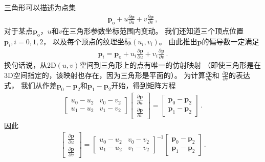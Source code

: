 三角形可以描述为点集
\begin{align*}
    \bm p_{\mathrm{o}}+u\frac{\partial \bm p}{\partial u}+v\frac{\partial \bm p}{\partial v}\, ,
\end{align*}
对于某点$\bm p_{\mathrm{o}}$，$u$和$v$在三角形参数坐标范围内变动。
我们还知道三个顶点位置$\bm p_i, i=0,1,2$，
以及每个顶点的纹理坐标$(u_i,v_i)$。
由此推出$\bm p$的偏导数一定满足
\begin{align*}
    \bm p_i=\bm p_{\mathrm{o}}+u_i\frac{\partial \bm p}{\partial u}+v_i\frac{\partial \bm p}{\partial v}\, .
\end{align*}
换句话说，从2D$(u,v)$空间到三角形上的点有唯一的仿射映射
（即使三角形是在3D空间指定的，该映射也存在，因为三角形是平面的）。
为计算$\displaystyle\frac{\partial \bm p}{\partial u}$和
$\displaystyle\frac{\partial \bm p}{\partial v}$的表达式，
我们从作差$\bm p_0-\bm p_2$和$\bm p_1-\bm p_2$开始，得到矩阵方程
\begin{align*}
    \left[\begin{array}{cc}
            u_0-u_2 & v_0-v_2 \\
            u_1-u_2 & v_1-v_2
        \end{array}\right]\left[\begin{array}{c}
            \displaystyle\frac{\partial \bm p}{\partial u} \\
            \displaystyle\frac{\partial \bm p}{\partial v}
        \end{array}\right]=\left[\begin{array}{c}
            \bm p_0-\bm p_2 \\
            \bm p_1-\bm p_2
        \end{array}\right]\, .
\end{align*}
因此
\begin{align*}
    \left[\begin{array}{c}
            \displaystyle\frac{\partial \bm p}{\partial u} \\
            \displaystyle\frac{\partial \bm p}{\partial v}
        \end{array}\right]=\left[\begin{array}{cc}
            u_0-u_2 & v_0-v_2 \\
            u_1-u_2 & v_1-v_2
        \end{array}\right]^{-1}\left[\begin{array}{c}
            \bm p_0-\bm p_2 \\
            \bm p_1-\bm p_2
        \end{array}\right]\, .
\end{align*}
